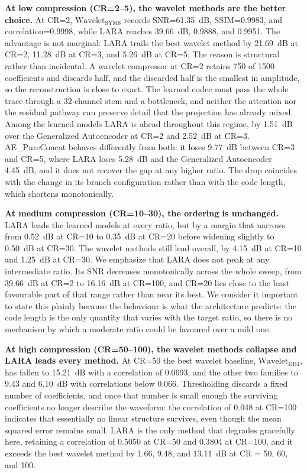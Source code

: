 \documentclass[fleqn,10pt]{wlscirep}
\begin{document}
\textbf{At low compression (CR=2--5), the wavelet methods are the better choice.} At CR=2, $\text{Wavelet}_{\text{SYM8}}$ records SNR=61.35~dB, SSIM=0.9983, and correlation=0.9998, while LARA reaches 39.66~dB, 0.9888, and 0.9951. The advantage is not marginal: LARA trails the best wavelet method by 21.69~dB at CR=2, 11.28~dB at CR=3, and 5.26~dB at CR=5. The reason is structural rather than incidental. A wavelet compressor at CR=2 retains 750 of 1500 coefficients and discards half, and the discarded half is the smallest in amplitude, so the reconstruction is close to exact. The learned codec must pass the whole trace through a 32-channel stem and a bottleneck, and neither the attention nor the residual pathway can preserve detail that the projection has already mixed. Among the learned models LARA is ahead throughout this regime, by 1.51~dB over the Generalized Autoencoder at CR=2 and 2.52~dB at CR=3. AE\_PureConcat behaves differently from both: it loses 9.77~dB between CR=3 and CR=5, where LARA loses 5.28~dB and the Generalized Autoencoder 4.45~dB, and it does not recover the gap at any higher ratio. The drop coincides with the change in its branch configuration rather than with the code length, which shortens monotonically.

\textbf{At medium compression (CR=10--30), the ordering is unchanged.} LARA leads the learned models at every ratio, but by a margin that narrows from 0.52~dB at CR=10 to 0.35~dB at CR=20 before widening slightly to 0.50~dB at CR=30. The wavelet methods still lead overall, by 4.15~dB at CR=10 and 1.25~dB at CR=30. We emphasize that LARA does not peak at any intermediate ratio. Its SNR decreases monotonically across the whole sweep, from 39.66~dB at CR=2 to 16.16~dB at CR=100, and CR=20 lies close to the least favourable part of that range rather than near its best. We consider it important to state this plainly because the behaviour is what the architecture predicts: the code length is the only quantity that varies with the target ratio, so there is no mechanism by which a moderate ratio could be favoured over a mild one.

\textbf{At high compression (CR=50--100), the wavelet methods collapse and LARA leads every method.} At CR=50 the best wavelet baseline, $\text{Wavelet}_{\text{DB4}}$, has fallen to 15.21~dB with a correlation of 0.0693, and the other two families to 9.43 and 6.10~dB with correlations below 0.066. Thresholding discards a fixed number of coefficients, and once that number is small enough the surviving coefficients no longer describe the waveform: the correlation of 0.048 at CR=100 indicates that essentially no linear structure survives, even though the mean squared error remains small. LARA is the only method that degrades gracefully here, retaining a correlation of 0.5050 at CR=50 and 0.3804 at CR=100, and it exceeds the best wavelet method by 1.66, 9.48, and 13.11~dB at CR = 50, 60, and 100.
\end{document}

